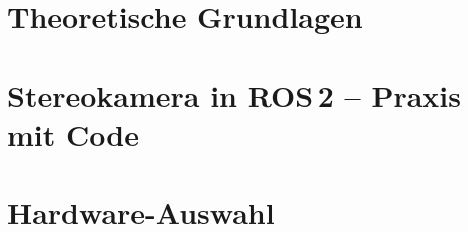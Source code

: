\documentclass[11pt,a4paper]{report}
\begin{document}

\setcounter{page}{1}



\clearpage
\tableofcontents
\clearpage

\setcounter{page}{1}

\part{Theoretische Grundlagen}












\part{Stereokamera in ROS\,2 -- Praxis mit Code}







\part{Hardware-Auswahl}




\end{document}
